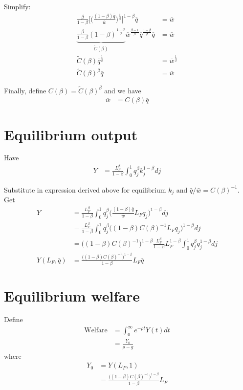 \documentclass[12pt,english]{article}
\theoremstyle{remark}
\begin{document}
Simplify:
\begin{align*}
	\frac{\beta}{1-\beta} \Big[ \Big( \frac{(1-\beta) \overline{q}}{\overline{w}}\Big)^{\frac{1}{\beta}} \Big]^{1-\beta} \overline{q} &= \overline{w} \\
	\underbrace{\frac{\beta}{1-\beta} (1-\beta)^{\frac{1-\beta}{\beta}}}_{\tilde{C}(\beta)} \overline{w}^{\frac{\beta-1}{\beta}} \overline{q}^{\frac{1-\beta}{\beta}} \overline{q} &= \overline{w} \\
	\tilde{C}(\beta) \overline{q}^{\frac{1}{\beta}} &= \overline{w}^{\frac{1}{\beta}} \\
	\tilde{C}(\beta)^{\beta} \overline{q} &= \overline{w}
\end{align*}

Finally, define $C(\beta) = \tilde{C}(\beta)^{\beta}$ and we have
\begin{align*}
	\overline{w} &= C(\beta) \overline{q}
\end{align*}

\section{Equilibrium output}
Have
\begin{align*}
	Y &= \frac{L_F^{\beta}}{1-\beta} \int_0^1 q_j^{\beta} k_j^{1-\beta} dj
\end{align*}

Substitute in expression derived above for equilibrium $k_j$ and $\bar{q}/\bar{w} = C(\beta)^{-1}$. Get
\begin{align*}
	Y &= \frac{L_F^{\beta}}{1-\beta} \int_0^1 q_j^{\beta} \Big( \frac{(1-\beta)\bar{q}}{\bar{w}}L_F q_j \Big)^{1-\beta} dj \\
	  &= \frac{L_F^{\beta}}{1-\beta} \int_0^1 q_j^{\beta} \Big( (1-\beta)C(\beta)^{-1} L_F q_j \Big)^{1-\beta} dj \\
	  &= \Big((1-\beta)C(\beta)^{-1} \Big)^{1-\beta} \frac{L_F^{\beta}}{1-\beta} L_F^{1-\beta} \int_0^1 q_j^{\beta} q_j^{1-\beta} dj \\
	Y(L_F,\bar{q}) &= \frac{\Big((1-\beta)C(\beta)^{-1} \Big)^{1-\beta} }{1-\beta}L_F \bar{q}
\end{align*}

\section{Equilibrium welfare}
Define
\begin{align*}
	\textrm{Welfare} &= \int_0^{\infty} e^{-\rho t}Y(t) dt \\
	                 &= \frac{Y_0}{\rho - g}
\end{align*}
where 
\begin{align*}
	Y_0 &= Y(L_F,1) \\
	    &= \frac{\Big((1-\beta)C(\beta)^{-1} \Big)^{1-\beta} }{1-\beta}L_F
\end{align*}
\end{document}
